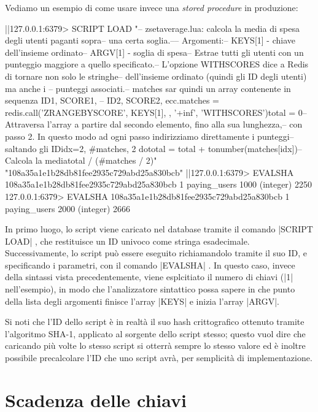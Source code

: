 Vediamo un esempio di come usare invece una \emph{stored procedure} in produzione:

\begin{commentedsource}[style=redis]
|\lnote|127.0.0.1:6379> SCRIPT LOAD "-- zsetaverage.lua: calcola la media di spesa degli utenti paganti sopra\n-- una certa soglia.\n--\n-- Argomenti:\n--     KEYS[1] - chiave dell'insieme ordinato\n--     ARGV[1] - soglia di spesa\n\n-- Estrae tutti gli utenti con un punteggio maggiore a quello specificato.\n-- L'opzione WITHSCORES dice a Redis di tornare non solo le stringhe\n-- dell'insieme ordinato (quindi gli ID degli utenti) ma anche i \n-- punteggi associati.\n-- matches sar quindi un array contenente in sequenza ID1, SCORE1, \n-- ID2, SCORE2, ecc.\nlocal matches = redis.call('ZRANGEBYSCORE', KEYS[1], \n\tARGV[1], '+inf', 'WITHSCORES')\n\nlocal total = 0\n\n-- Attraversa l'array a partire dal secondo elemento, fino alla sua lunghezza,\n-- con passo 2. In questo modo ad ogni passo indirizziamo direttamente i punteggi\n-- saltando gli ID\nfor idx=2, #matches, 2 do\n    total = total + tonumber(matches[idx])\nend\n\n-- Calcola la media\nreturn total / (#matches / 2)\n"
"108a35a1e1b28db81fee2935c729abd25a830bcb"
|\lnote|127.0.0.1:6379> EVALSHA 108a35a1e1b28db81fee2935c729abd25a830bcb 1 paying_users 1000
(integer) 2250
127.0.0.1:6379> EVALSHA 108a35a1e1b28db81fee2935c729abd25a830bcb 1 paying_users 2000
(integer) 2666
\end{commentedsource}

In primo luogo, lo script viene caricato nel database tramite il comando \cverb|SCRIPT LOAD|
, che restituisce un ID univoco come stringa esadecimale. Successivamente, lo script può
essere eseguito richiamandolo tramite il suo ID, e specificando i parametri, con il comando
\cverb|EVALSHA| . In questo caso, invece della sintassi vista precedentemente,
viene esplcitiato il numero di chiavi (\cverb|1| nell'esempio), in modo che l'analizzatore
sintattico possa sapere in che punto della lista degli argomenti finisce l'array \cverb|KEYS| e
inizia l'array \cverb|ARGV|.

Si noti che l'ID dello script è in realtà il suo hash crittografico ottenuto tramite l'algoritmo
SHA-1, applicato al sorgente dello script stesso; questo vuol dire che caricando più volte lo stesso
script si otterrà sempre lo stesso valore ed è inoltre possibile precalcolare l'ID che uno script
avrà, per semplicità di implementazione.

\section{Scadenza delle chiavi}

